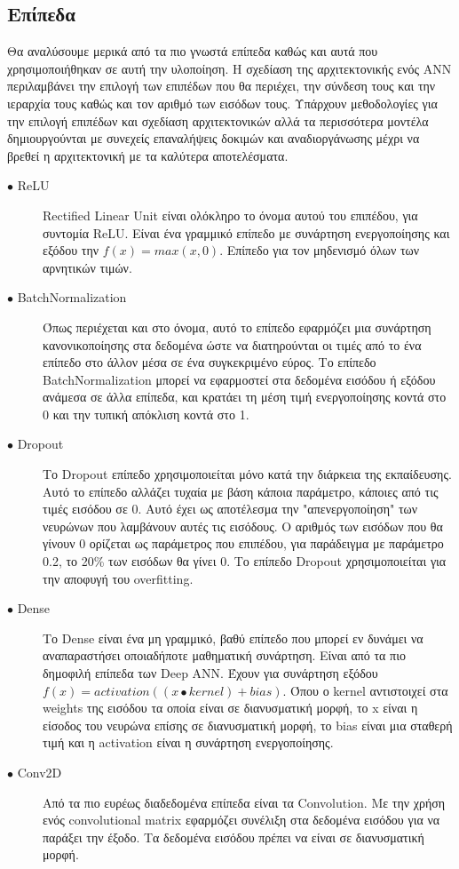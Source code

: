 \subsection{Επίπεδα}
Θα αναλύσουμε μερικά από τα πιο γνωστά επίπεδα καθώς και αυτά που χρησιμοποιήθηκαν σε αυτή την υλοποίηση. Η σχεδίαση της αρχιτεκτονικής ενός ANN περιλαμβάνει την επιλογή των επιπέδων που θα περιέχει, την σύνδεση τους και την ιεραρχία τους καθώς και τον αριθμό των εισόδων τους. Υπάρχουν μεθοδολογίες για την επιλογή επιπέδων και σχεδίαση αρχιτεκτονικών αλλά τα περισσότερα μοντέλα δημιουργούνται με συνεχείς επαναλήψεις δοκιμών και αναδιοργάνωσης μέχρι να βρεθεί η αρχιτεκτονική με τα καλύτερα αποτελέσματα.

\begin{description}

\item[$\bullet$ ReLU] Rectified Linear Unit είναι ολόκληρο το όνομα αυτού του επιπέδου, για συντομία ReLU. Είναι ένα γραμμικό επίπεδο με συνάρτηση ενεργοποίησης και εξόδου την $f(x) = max(x, 0)$. Επίπεδο για τον μηδενισμό όλων των αρνητικών τιμών.

\item[$\bullet$ BatchNormalization] Όπως περιέχεται και στο όνομα, αυτό το επίπεδο εφαρμόζει μια συνάρτηση κανονικοποίησης στα δεδομένα ώστε να διατηρούνται οι τιμές από το ένα επίπεδο στο άλλον μέσα σε ένα συγκεκριμένο εύρος. Το επίπεδο BatchNormalization μπορεί να εφαρμοστεί στα δεδομένα εισόδου ή εξόδου ανάμεσα σε άλλα επίπεδα, και κρατάει τη μέση τιμή ενεργοποίησης κοντά στο 0 και την τυπική απόκλιση κοντά στο 1. \cite{batch}

\item[$\bullet$ Dropout ] Το Dropout επίπεδο χρησιμοποιείται μόνο κατά την διάρκεια της εκπαίδευσης. Αυτό το επίπεδο αλλάζει τυχαία με βάση κάποια παράμετρο, κάποιες από τις τιμές εισόδου σε 0. Αυτό έχει ως αποτέλεσμα την "απενεργοποίηση" των νευρώνων που λαμβάνουν αυτές τις εισόδους. Ο αριθμός των εισόδων που θα γίνουν 0 ορίζεται ως παράμετρος που επιπέδου, για παράδειγμα με παράμετρο 0.2, το 20\% των εισόδων θα γίνει 0. Το επίπεδο Dropout χρησιμοποιείται για την αποφυγή του overfitting. \cite{dropout}

\item[$\bullet$ Dense] Το Dense είναι ένα μη γραμμικό, βαθύ επίπεδο που μπορεί εν δυνάμει να αναπαραστήσει οποιαδήποτε μαθηματική συνάρτηση. Είναι από τα πιο δημοφιλή επίπεδα των Deep ANN. Έχουν για συνάρτηση εξόδου  $f(x) = activation((x \bullet kernel) + bias)$. Όπου ο kernel αντιστοιχεί στα weights της εισόδου τα οποία είναι σε διανυσματική μορφή, το x είναι η είσοδος του νευρώνα επίσης σε διανυσματική μορφή, το bias είναι μια σταθερή τιμή και η activation είναι η συνάρτηση ενεργοποίησης. \cite{dense}

\item[$\bullet$ Conv2D] Από τα πιο ευρέως διαδεδομένα επίπεδα είναι τα Convolution. Με την χρήση ενός convolutional matrix εφαρμόζει συνέλιξη στα δεδομένα εισόδου για να παράξει την έξοδο. Τα δεδομένα εισόδου πρέπει να είναι σε διανυσματική μορφή.

\end{description}



